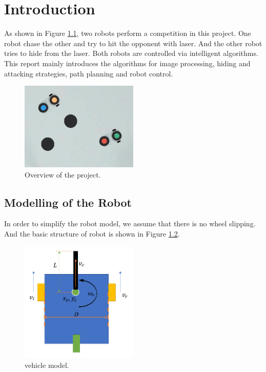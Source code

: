 \chapter{Introduction}
\renewcommand{\thepage}{\arabic{page}}
\setcounter{page}{1}

As shown in Figure \ref{intro}, two robots perform a competition in this project. One robot chase the other and try to hit the opponent with laser. And the other robot tries to hide from the laser. Both robots are controlled via intelligent algorithms. This report mainly introduces the algorithms for image processing, hiding and attacking strategies, path planning and robot control.

\begin{figure}[thb]
    \centering
    \includegraphics[width=0.5\textwidth]{images/intro.png}
    \caption[Overview of the project]{Overview of the project.}\label{intro}
\end{figure}

\section{Modelling of the Robot}

In order to simplify the robot model, we assume that there is no wheel slipping. And the basic structure of robot is shown in Figure \ref{vehicle_model}.

\begin{figure}[thb]
    \centering
    \includegraphics[width=0.5\textwidth]{images/vehicle_model.png}
    \caption[vehicle model]{vehicle model.}\label{vehicle_model}
\end{figure}

